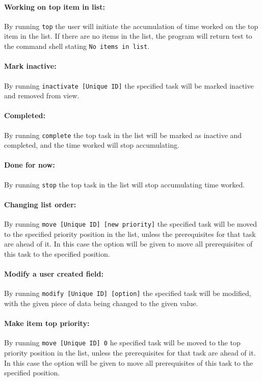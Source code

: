 \documentclass[12pt]{article}
\newcommand{\e}[1] {{\tt #1}}
\begin{document}
\paragraph{Working on top item in list:} \label{sec:Working on top} By running \e{top} the user will initiate the accumulation of time worked on the top item in the list. If there are no items in the list, the program will return test to the command shell stating \e{No items in list}.
\paragraph{Mark inactive:} \label{sec:Mark inactive} By running \e{inactivate [Unique ID]} the specified task will be marked inactive and removed from view.
\paragraph{Completed:} \label{sec:Completed} By running \e{complete} the top task in the list will be marked as inactive and completed, and the time worked will stop accumulating.
\paragraph{Done for now:} \label{sec:Done for now} By running \e{stop} the top task in the list will stop accumulating time worked.
\paragraph{Changing list order:} \label{sec:Change order} By running \e{move [Unique ID] [new priority]} the specified task will be moved to the specified priority position in the list, unless the prerequisites for that task are ahead of it. In this case the option will be given to move all prerequisites of this task to the specified position.
\paragraph{Modify a user created field:} \label{sec:Modify} By running \e{modify [Unique ID] [option]} the specified task will be modified, with the given piece of data being changed to the given value.
\paragraph{Make item top priority:} \label{sec:Make top} By running \e{move [Unique ID] 0} he specified task will be moved to the top priority position in the list, unless the prerequisites for that task are ahead of it. In this case the option will be given to move all prerequisites of this task to the specified position.
\end{document}
